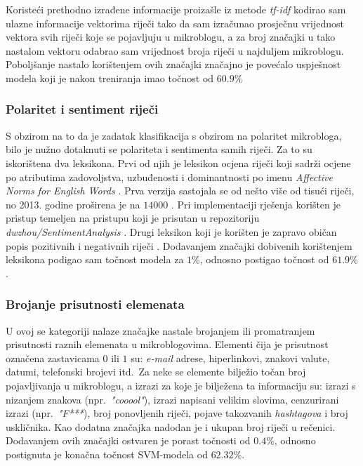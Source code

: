 \documentclass[times, utf8, zavrsni]{fer}
\begin{document}
Koristeći prethodno izrađene informacije proizašle iz metode \emph{tf-idf} kodirao sam ulazne informacije vektorima riječi tako da sam izračunao prosječnu vrijednost vektora svih riječi koje se pojavljuju u mikroblogu, a za broj značajki u tako nastalom vektoru odabrao sam vrijednost broja riječi u najduljem mikroblogu. Poboljšanje nastalo korištenjem ovih značajki značajno je povećalo uspješnost modela koji je nakon treniranja imao točnost od $60.9\%$

\subsubsection{Polaritet i sentiment riječi}

S obzirom na to da je zadatak klasifikacija s obzirom na polaritet mikrobloga, bilo je nužno dotaknuti se polariteta i sentimenta samih riječi. Za to su iskorištena dva leksikona. Prvi od njih je leksikon ocjena riječi koji sadrži ocjene po atributima zadovoljstva, uzbuđenosti i dominantnosti po imenu  \emph{Affective Norms for English Words} \citep{anew}. Prva verzija sastojala se od nešto više od tisući riječi, no 2013. godine proširena je na $14000$ \citep{anew2}. Pri implementaciji rješenja korišten je pristup temeljen na pristupu koji je prisutan u repozitoriju \emph{dwzhou/SentimentAnalysis} \citep{anew_code}. Drugi leksikon koji je korišten je zapravo običan popis pozitivnih i negativnih riječi \citep{leksikon}. 
\noindent Dodavanjem značajki dobivenih korištenjem leksikona podigao sam točnost modela za $1\%$, odnosno postigao točnost od $61.9\%$.

\subsubsection{Brojanje prisutnosti elemenata}

U ovoj se kategoriji nalaze značajke nastale brojanjem ili promatranjem prisutnosti raznih elemenata u mikroblogovima. Elementi čija je prisutnost označena zastavicama $0$ ili $1$ su: \emph{e-mail} adrese, hiperlinkovi, znakovi valute, datumi, telefonski brojevi itd.~Za neke se elemente bilježio točan broj pojavljivanja u mikroblogu, a izrazi za koje je bilježena ta informaciju su: izrazi s nizanjem znakova (npr.~\emph{"cooool"}), izrazi napisani velikim slovima, cenzurirani izrazi (npr.~\emph{"F***}), broj ponovljenih riječi, pojave takozvanih \emph{hashtagova} i broj uskličnika. Kao dodatna značajka nadodan je i ukupan broj riječi u rečenici.
\noindent Dodavanjem ovih značajki ostvaren je porast točnosti od $0.4\%$, odnosno postignuta je konačna točnost \gls{SVM}-modela od $62.32\%$.
\end{document}
